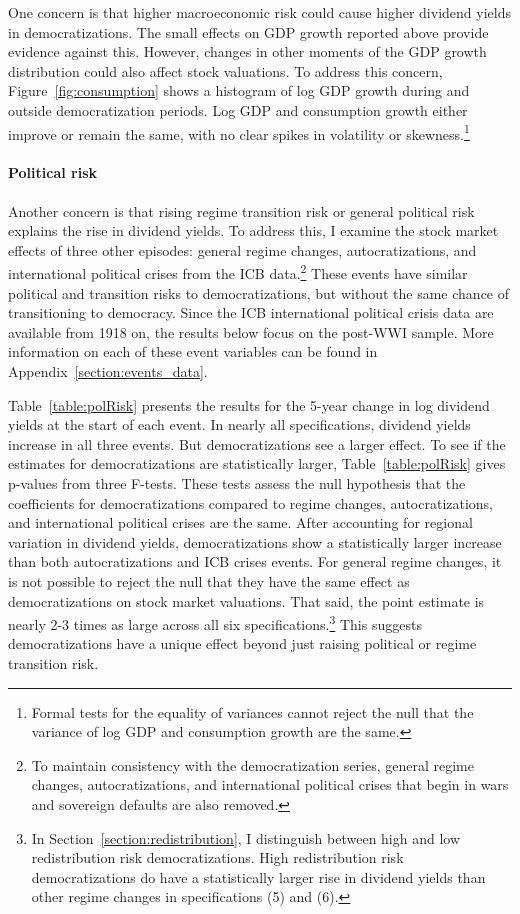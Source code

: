 \documentclass[12pt]{article}
\numberwithin{equation}{section}
\begin{document}
One concern is that higher macroeconomic risk could cause higher dividend yields in democratizations. The small effects on GDP growth reported above provide evidence against this. However, changes in other moments of the GDP growth distribution could also affect stock valuations. To address this concern, Figure~\ref{fig:consumption} shows a histogram of log GDP growth during and outside democratization periods. Log GDP and consumption growth either improve or remain the same, with no clear spikes in volatility or skewness.\footnote{Formal tests for the equality of variances cannot reject the null that the variance of log GDP and consumption growth are the same.}

\paragraph{Political risk}
Another concern is that rising regime transition risk or general political risk explains the rise in dividend yields. To address this, I examine the stock market effects of three other episodes: general regime changes, autocratizations, and international political crises from the ICB data.\footnote{To maintain consistency with the democratization series, general regime changes, autocratizations, and international political crises that begin in wars and sovereign defaults are also removed.} These events have similar political and transition risks to democratizations, but without the same chance of transitioning to democracy. Since the ICB international political crisis data are available from 1918 on, the results below focus on the post-WWI sample. More information on each of these event variables can be found in Appendix~\ref{section:events_data}.

Table~\ref{table:polRisk} presents the results for the 5-year change in log dividend yields at the start of each event.  In nearly all specifications, dividend yields increase in all three events. But democratizations see a larger effect. To see if the estimates for democratizations are statistically larger, Table~\ref{table:polRisk} gives p-values from three F-tests. These tests assess the null hypothesis that the coefficients for democratizations compared to regime changes, autocratizations, and international political crises are the same. After accounting for regional variation in dividend yields, democratizations show a statistically larger increase than both autocratizations and ICB crises events. For general regime changes, it is not possible to reject the null that they have the same effect as democratizations on stock market valuations. That said, the point estimate is nearly 2-3 times as large across all six specifications.\footnote{In Section~\ref{section:redistribution}, I distinguish between high and low redistribution risk democratizations. High redistribution risk democratizations do have a statistically larger rise in dividend yields than other regime changes in specifications (5) and (6).} This suggests democratizations have a unique effect beyond just raising political or regime transition risk. 
\end{document}
